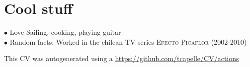 \documentclass[11pt,a4paper,sans]{moderncv} %
\begin{document}


\section{Cool stuff}
$\bullet$ Love Sailing, cooking, playing guitar\\
$\bullet$ Random facts: Worked in the chilean TV series \textsc{Efecto Picaflor} (2002-2010)

This CV was autogenerated using a \href{Github Action}{https://github.com/tcapelle/CV/actions}
\end{document}
